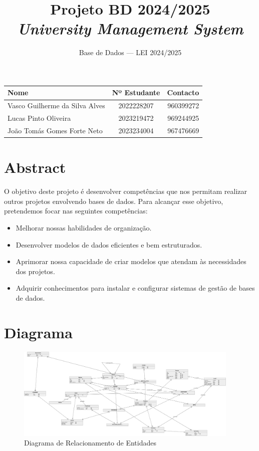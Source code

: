 \documentclass[a4paper, 11pt]{article}
\title{\Huge Projeto BD 2024/2025\\
        \it \huge University Management System
}
\author{Base de Dados --- LEI 2024/2025}
\date{}
\begin{document}
\maketitle
\begin{center}
    \begin{tabularx}{0.8\textwidth}{Xcr}
    \bf Nome  & \bf Nº Estudante & \bf Contacto  \\\midrule
    Vasco Guilherme da Silva Alves & 2022228207 & 960399272\\
    Lucas Pinto Oliveira & 2023219472 & 969244925 \\ 
    João Tomás Gomes Forte Neto & 2023234004 & 967476669
    \end{tabularx}
\end{center}

\tableofcontents

\newpage
\section{Abstract}
O objetivo deste projeto é desenvolver competências que nos permitam realizar outros projetos envolvendo bases de dados. Para alcançar esse objetivo, pretendemos focar nas seguintes competências: 

\begin{itemize}
  \item Melhorar nossas habilidades de organização.
  \item Desenvolver modelos de dados eficientes e bem estruturados.
  \item Aprimorar nossa capacidade de criar modelos que atendam às necessidades dos projetos.
  \item Adquirir conhecimentos para instalar e configurar sistemas de gestão de bases de dados.
\end{itemize}

\section{Diagrama}
\begin{figure}[h!]
    \centering
    \includegraphics[width=0.95\textwidth]{mrbreast.png}
    \caption{Diagrama de Relacionamento de Entidades}
    \label{fig:tensa-bullet}
\end{figure}
\end{document}
